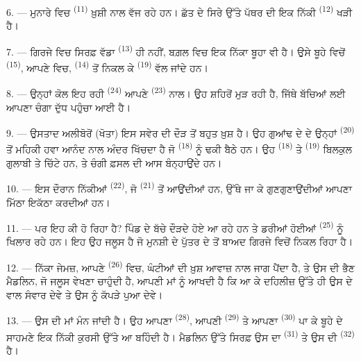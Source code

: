 6. --- ਮੁਨਾਰੇ ਵਿਚ  \textsuperscript{(11)} ਖ਼ੁਸ਼ੀ ਨਾਲ ਵੱਜ ਰਹੇ ਹਨ। ਛੱਤ
ਦੇ ਸਿਰੇ ਉੱਤੇ ਪੱਥਰ ਦੀ ਇਕ ਨਿੱਕੀ  \textsuperscript{(12)} ਖੜੀ ਹੈ।

7. --- ਗਿਰਜੇ ਵਿਚ ਸਿਰਫ਼ ਵੱਡਾ  \textsuperscript{(13)} ਹੀ ਨਹੀਂ, ਬਗ਼ਲ
ਵਿਚ ਇਕ ਨਿੱਕਾ ਬੂਹਾ ਵੀ ਹੈ। ਉਸੇ ਬੂਹੇ ਵਿਚੋਂ  \textsuperscript{(15)},
ਆਪਣੇ  ਵਿਚ,  \textsuperscript{(14)} ਤੋਂ
ਨਿਕਲ ਕੇ  \textsuperscript{(19)} ਵੱਲ ਜਾਂਦੇ ਹਨ।

8. --- ਉਨ੍ਹਾਂ ਕੋਲ ਇਹ ਰਹੀ  \textsuperscript{(24)} ਆਪਣੇ
 \textsuperscript{(23)} ਨਾਲ। ਉਹ ਸ਼ਹਿਰੋਂ ਮੁੜ ਰਹੀ ਹੈ, ਜਿੱਥੇ ਬੱਚਿਆਂ ਲਈ
ਆਪਣਾ ਚੰਗਾ ਦੁੱਧ ਪਹੁੰਚਾ ਆਈ ਹੈ।

\VUsaut{4.0mm}
\VUsaut{3.4mm}

9. --- ਉਸਤਾਦ ਅਲੀਬੋਰੋਂ (ਖੋਤਾ) ਇਸ ਸਵੇਰ ਦੀ ਦੌੜ ਤੋਂ ਬਹੁਤ ਖ਼ੁਸ਼ ਹੈ। ਉਹ ਗੁਆਂਢ ਦੇ
 ਦੇ ਉਨ੍ਹਾਂ  \textsuperscript{(20)} ਤੋਂ ਮਹਿਕੀ ਹਵਾ
ਆਨੰਦ ਨਾਲ ਅੰਦਰ ਖਿੱਚਦਾ ਹੈ ਜੋ  \textsuperscript{(18)} ਨੂੰ
ਢਕੀ ਬੈਠੇ ਹਨ। ਉਹ  \textsuperscript{(18)} ਤੇ
 \textsuperscript{(19)} ਬਿਲਕੁਲ ਗੁਲਾਬੀ ਤੇ ਚਿੱਟੇ ਹਨ, ਤੇ
ਚੰਗੀ ਫ਼ਸਲ ਦੀ ਆਸ ਬੰਨ੍ਹਾਉਂਦੇ ਹਨ।

10. --- ਇਸ ਦੌਰਾਨ ਨਿੱਕੀਆਂ  \textsuperscript{(22)}, ਜੋ
 \textsuperscript{(21)} ਤੋਂ ਆਉਂਦੀਆਂ ਹਨ, ਉੱਥੇ ਜਾ ਕੇ ਗੁਣਗੁਣਾਉਂਦੀਆਂ
ਆਪਣਾ ਮਿੱਠਾ  ਇਕੱਠਾ ਕਰਦੀਆਂ ਹਨ।

11. --- ਪਰ ਇਹ ਕੀ ਹੋ ਰਿਹਾ ਹੈ? ਪਿੰਡ ਦੇ ਬੱਚੇ ਦੌੜਦੇ ਹੋਏ ਆ ਰਹੇ ਹਨ ਤੇ ਡਰੀਆਂ ਹੋਈਆਂ
 \textsuperscript{(25)} ਨੂੰ ਖਿਲਾਰ ਰਹੇ ਹਨ। ਇਹ ਉਹ ਜਲੂਸ ਹੈ ਜੋ ਮੁਨਸ਼ੀ
ਦੇ ਪੁੱਤਰ ਦੇ  ਤੋਂ ਬਾਅਦ ਗਿਰਜੇ ਵਿਚੋਂ ਨਿਕਲ ਰਿਹਾ ਹੈ।

12. --- ਨਿੱਕਾ ਜੇਮਜ਼, ਆਪਣੇ  \textsuperscript{(26)} ਵਿਚ, ਘੰਟੀਆਂ ਦੀ
ਖ਼ੁਸ਼ ਆਵਾਜ਼ ਨਾਲ ਜਾਗ ਪੈਂਦਾ ਹੈ, ਤੇ ਉਸ ਦੀ ਭੈਣ ਮੈਡਲਿਨ, ਜੋ ਜਲੂਸ ਵੇਖਣਾ ਚਾਹੁੰਦੀ ਹੈ,
ਆਪਣੀ ਮਾਂ ਨੂੰ ਆਖਦੀ ਹੈ ਕਿ ਆ ਕੇ ਦਹਿਲੀਜ਼ ਉੱਤੇ ਹੀ ਉਸ ਦੇ ਵਾਲ ਸੰਵਾਰ ਦੇਵੇ ਤੇ ਉਸ ਨੂੰ
ਕੱਪੜੇ ਪੁਆ ਦੇਵੇ।

13. --- ਉਸ ਦੀ ਮਾਂ ਮੰਨ ਜਾਂਦੀ ਹੈ। ਉਹ ਆਪਣਾ 
\textsuperscript{(28)}, ਆਪਣੀ  \textsuperscript{(29)} ਤੇ ਆਪਣਾ
 \textsuperscript{(30)} ਪਾ ਕੇ ਬੂਹੇ ਦੇ ਸਾਹਮਣੇ ਇਕ ਨਿੱਕੀ ਕੁਰਸੀ ਉੱਤੇ ਆ
ਬਹਿੰਦੀ ਹੈ। ਮੈਡਲਿਨ ਉੱਤੇ ਸਿਰਫ਼ ਉਸ ਦਾ  \textsuperscript{(31)} ਤੇ ਉਸ
ਦੀ  \textsuperscript{(32)} ਹੈ।

